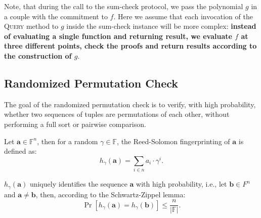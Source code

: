 \documentclass[../lecture-notes-148x210.tex]{subfiles}
\begin{document}
\begin{remark}
    Note, that during the call to the sum-check protocol, we pass the polynomial $g$ in a couple with the 
    commitment to $f$. Here we assume that each invocation of the \textsc{Query} method to $g$ inside the 
    sum-check instance will be more complex: \textbf{instead of evaluating a single function and returning 
    result, we evaluate $f$ at three different points, check the proofs and return results according to the
    construction of $g$}.
\end{remark}

\subsection{Randomized Permutation Check}
\label{sec:randomized-permutation-check}

The goal of the randomized permutation check is to verify, with high probability, whether two sequences
of tuples are permutations of each other, without performing a full sort or pairwise comparison.

\begin{definition}
    Let $\mathbf{a} \in \mathbb{F}^{n}$, then for a random $\gamma \in \mathbb{F}$, the Reed-Solomon 
    fingerprinting of $\mathbf{a}$ is defined as:
    \begin{equation*}
        h_{\gamma}(\mathbf{a}) = \sum_{i \in n} a_i \cdot \gamma^i.
    \end{equation*}

    $h_{\gamma}(\mathbf{a})$ uniquely identifies the sequence $\mathbf{a}$ with high probability,
    i.e., let $\mathbf{b} \in F^n$ and $\mathbf{a} \neq \mathbf{b}$, then, according to the Schwartz-Zippel lemma:
    \begin{equation*}
        \Pr[h_{\gamma}(\mathbf{a}) = h_{\gamma}(\mathbf{b})] \leq \frac{n}{|\mathbb{F}|}.
    \end{equation*}
\end{definition}
\end{document}
